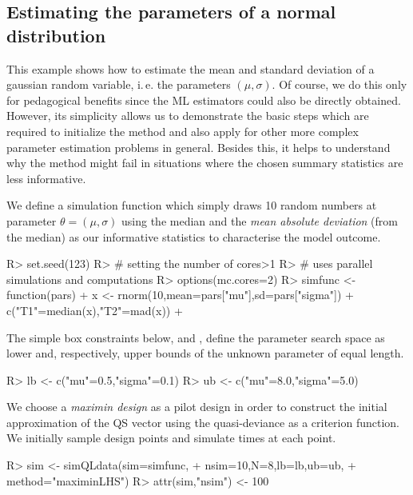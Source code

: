 \documentclass[article, nojss]{jss}
\numberwithin{equation}{section}			%
\begin{document}
\subsection{Estimating the parameters of a normal distribution}
This example shows how to estimate the mean and standard deviation of a gaussian
random variable, i.\,e. the parameters $(\mu,\sigma)$. Of course, we do this
only for pedagogical benefits since the ML estimators could also be directly obtained.
However, its simplicity allows us to demonstrate the basic steps which are
required to initialize the method and also apply for other more complex parameter
estimation problems in general. Besides this, it helps to understand why the
method might fail in situations where the chosen summary statistics are less informative.\par
%
We define a simulation function which simply draws 10 random numbers at
parameter $\theta=(\mu,\sigma)$ using the median and the \emph{mean
absolute deviation} (from the median) as our informative statistics to
characterise the model outcome.
\begin{Schunk}
\begin{Sinput}
R> set.seed(123)
R> # setting the number of cores>1
R> # uses parallel simulations and computations
R> options(mc.cores=2)
R> simfunc <- function(pars) {	
+ 	x <- rnorm(10,mean=pars["mu"],sd=pars["sigma"])    
+ 	c("T1"=median(x),"T2"=mad(x))	
+ }
\end{Sinput}
\end{Schunk}
The simple box constraints below,  and , define the parameter
search space as lower and, respectively, upper bounds of the unknown parameter
of equal length.
\begin{Schunk}
\begin{Sinput}
R> lb <- c("mu"=0.5,"sigma"=0.1)
R> ub <- c("mu"=8.0,"sigma"=5.0)
\end{Sinput}
\end{Schunk}
We choose a \emph{maximin design} as a pilot design in order to construct the
initial approximation of the QS vector using the quasi-deviance as a
criterion function. We initially sample  design points and simulate
 times at each point.
\begin{Schunk}
\begin{Sinput}
R> sim <- simQLdata(sim=simfunc,
+            nsim=10,N=8,lb=lb,ub=ub,
+               method="maximinLHS")
R> attr(sim,"nsim") <- 100
\end{Sinput}
\end{Schunk}
\end{document}
